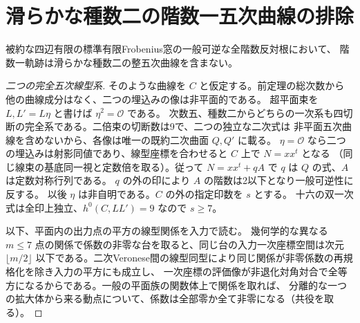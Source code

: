 \section{滑らかな種数二の階数一五次曲線の排除}
\label{sec:rank-one-genus-two-quintic}
\begin{theorem}\label{thm:rank-one-genus-two-quintic}
被約な四辺有限の標準有限Frobenius窓の一般可逆な全階数反対根において、
階数一軌跡は滑らかな種数二の整五次曲線を含まない。
\end{theorem}
\begin{proof}[二つの完全五次線型系]
そのような曲線を $C$ と仮定する。前定理の総次数から他の曲線成分はなく、二つの埋込みの像は非平面的である。
超平面束を $L,L'=L\eta$ と書けば $\eta^2=\mathcal O$ である。
次数五、種数二からどちらの一次系も四切断の完全系である。二倍束の切断数は9で、二つの独立な二次式は
非平面五次曲線を含めないから、各像は唯一の既約二次曲面 $Q,Q'$ に載る。
$\eta=\mathcal O$ なら二つの埋込みは射影同値であり、線型座標を合わせると $C$ 上で $N=xx^t$ となる
（同じ線束の基底同一視と定数倍を取る）。従って $N=xx^t+qA$ で $q$ は $Q$ の式、$A$ は定数対称行列である。
$q$ の外の印により $A$ の階数は2以下となり一般可逆性に反する。
以後 $\eta$ は非自明である。$C$ の外の指定印数を $s$ とする。
十六の双一次式は全印上独立、$h^0(C,LL')=9$ なので $s\ge7$。

以下、平面内の出力点の平方の線型関係を入力で読む。
幾何学的な異なる $m\le7$ 点の関係で係数の非零な台を取ると、同じ台の入力一次座標空間は次元
$\lfloor m/2\rfloor$ 以下である。二次Veronese間の線型同型により同じ関係が非零係数の再規格化を除き入力の平方にも成立し、
一次座標の評価像が非退化対角対合で全等方になるからである。一般の平面族の関数体上で関係を取れば、
分離的な一つの拡大体から来る動点について、係数は全部零か全て非零になる（共役を取る）。
\end{proof}
